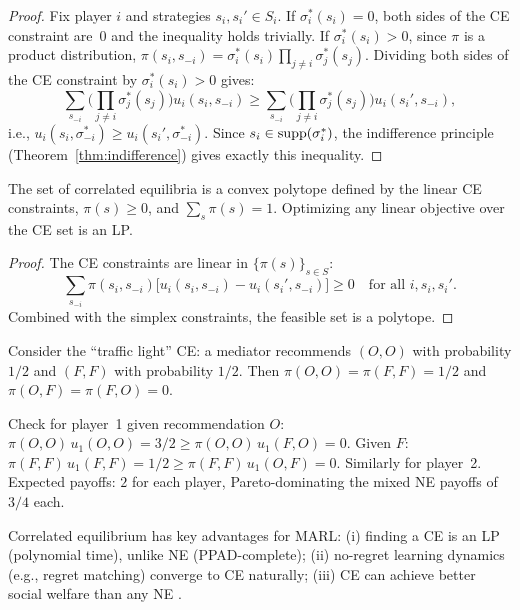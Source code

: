 \documentclass[11pt,a4paper]{article}
\begin{document}
\begin{proof}
Fix player $i$ and strategies $s_i, s_i' \in S_i$. If $\sigma_i^*(s_i) = 0$,
both sides of the CE constraint are~0 and the inequality holds trivially.
If $\sigma_i^*(s_i) > 0$, since $\pi$ is a product distribution,
$\pi(s_i, s_{-i}) = \sigma_i^*(s_i) \prod_{j \neq i} \sigma_j^*(s_j)$.
Dividing both sides of the CE constraint by $\sigma_i^*(s_i) > 0$ gives:
\[
    \sum_{s_{-i}} \bigg(\prod_{j \neq i} \sigma_j^*(s_j)\bigg) u_i(s_i, s_{-i})
    \geq \sum_{s_{-i}} \bigg(\prod_{j \neq i} \sigma_j^*(s_j)\bigg)
    u_i(s_i', s_{-i}),
\]
i.e., $u_i(s_i, \sigma_{-i}^*) \geq u_i(s_i', \sigma_{-i}^*)$.
Since $s_i \in \operatorname{supp}(\sigma_i^*)$, the indifference principle
(Theorem~\ref{thm:indifference}) gives exactly this inequality.
\end{proof}

\begin{proposition}
\label{prop:ce_lp}
The set of correlated equilibria is a convex polytope defined by the linear
CE constraints, $\pi(s) \geq 0$, and $\sum_s \pi(s) = 1$. Optimizing any
linear objective over the CE set is an LP.
\end{proposition}

\begin{proof}
The CE constraints are linear in $\{\pi(s)\}_{s \in S}$:
\[
    \sum_{s_{-i}} \pi(s_i, s_{-i})\big[u_i(s_i, s_{-i})
    - u_i(s_i', s_{-i})\big] \geq 0
    \quad \text{for all } i, s_i, s_i'.
\]
Combined with the simplex constraints, the feasible set is a polytope.
\end{proof}

\begin{example}
\label{ex:ce_bos}
Consider the ``traffic light'' CE: a mediator recommends $(O,O)$ with
probability $1/2$ and $(F,F)$ with probability $1/2$. Then
$\pi(O,O) = \pi(F,F) = 1/2$ and $\pi(O,F) = \pi(F,O) = 0$.

Check for player~1 given recommendation $O$:
$\pi(O,O)\, u_1(O,O) = 3/2 \geq \pi(O,O)\, u_1(F,O) = 0$. Given $F$:
$\pi(F,F)\, u_1(F,F) = 1/2 \geq \pi(F,F)\, u_1(O,F) = 0$. Similarly for
player~2. Expected payoffs: $2$ for each player, Pareto-dominating the
mixed NE payoffs of $3/4$ each.
\end{example}

\begin{rlconnection}
Correlated equilibrium has key advantages for MARL: (i) finding a CE is an LP
(polynomial time), unlike NE (PPAD-complete); (ii) no-regret learning
dynamics (e.g., regret matching) converge to CE naturally; (iii) CE can
achieve better social welfare than any NE \citep{aumann1974}.
\end{rlconnection}
\end{document}
